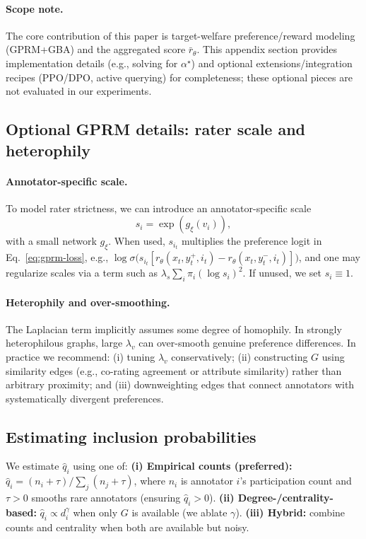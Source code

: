 \documentclass{article}
\theoremstyle{plain}
\theoremstyle{definition}
\theoremstyle{remark}
\begin{document}
\paragraph{Scope note.}
The core contribution of this paper is target-welfare preference/reward modeling (GPRM+GBA) and the aggregated score $\bar r_\theta$.
This appendix section provides implementation details (e.g., solving for $\alpha^\star$) and optional extensions/integration recipes (PPO/DPO, active querying) for completeness; these optional pieces are not evaluated in our experiments.

\subsection{Optional GPRM details: rater scale and heterophily}
\label{app:gprm-optional}

\paragraph{Annotator-specific scale.}
To model rater strictness, we can introduce an annotator-specific scale
\begin{equation}
    s_i = \exp(g_\xi(v_i)),
    \label{eq:scale}
\end{equation}
with a small network $g_\xi$. When used, $s_{i_t}$ multiplies the preference logit in
Eq.~\eqref{eq:gprm-loss}, e.g.,
$\log\sigma\!\big(s_{i_t}[r_\theta(x_t,y_t^+,i_t)-r_\theta(x_t,y_t^-,i_t)]\big)$,
and one may regularize scales via a term such as $\lambda_s\sum_i \pi_i(\log s_i)^2$.
If unused, we set $s_i\equiv 1$.

\paragraph{Heterophily and over-smoothing.}
\label{app:gprm-heterophily}
The Laplacian term implicitly assumes some degree of homophily. In strongly
heterophilous graphs, large $\lambda_v$ can over-smooth genuine preference
differences. In practice we recommend: (i) tuning $\lambda_v$ conservatively;
(ii) constructing $G$ using similarity edges (e.g., co-rating agreement or
attribute similarity) rather than arbitrary proximity; and (iii) downweighting
edges that connect annotators with systematically divergent preferences.

\subsection{Estimating inclusion probabilities}
\label{app:qhat-estimators}
We estimate $\hat q_i$ using one of:
\textbf{(i) Empirical counts (preferred):}
$\hat q_i = (n_i+\tau)/\sum_j (n_j+\tau)$,
where $n_i$ is annotator $i$'s participation count and $\tau>0$ smooths rare
annotators (ensuring $\hat q_i>0$).
\textbf{(ii) Degree-/centrality-based:} $\hat q_i \propto d_i^\gamma$ when only
$G$ is available (we ablate $\gamma$).
\textbf{(iii) Hybrid:} combine counts and centrality when both are available
but noisy.
\end{document}
